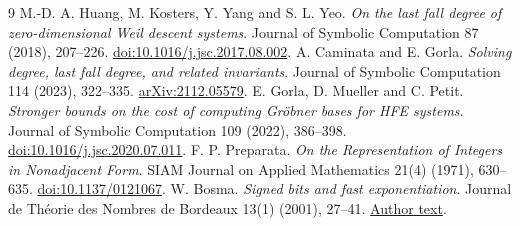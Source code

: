 \documentclass[11pt]{article}
\theoremstyle{remark}\newtheorem{remark}[theorem]{Remark}
\begin{document}
\begin{thebibliography}{9}
 M.-D. A. Huang, M. Kosters, Y. Yang and S. L. Yeo.
\emph{On the last fall degree of zero-dimensional Weil descent systems}.
Journal of Symbolic Computation 87 (2018), 207--226.
\href{https://doi.org/10.1016/j.jsc.2017.08.002}{doi:10.1016/j.jsc.2017.08.002}.
 A. Caminata and E. Gorla.
\emph{Solving degree, last fall degree, and related invariants}.
Journal of Symbolic Computation 114 (2023), 322--335.
\href{https://arxiv.org/abs/2112.05579}{arXiv:2112.05579}.
 E. Gorla, D. Mueller and C. Petit.
\emph{Stronger bounds on the cost of computing Gr\"obner bases for HFE systems}.
 Journal of Symbolic Computation 109 (2022), 386--398.
\href{https://doi.org/10.1016/j.jsc.2020.07.011}{doi:10.1016/j.jsc.2020.07.011}.
 F. P. Preparata.
\emph{On the Representation of Integers in Nonadjacent Form}.
SIAM Journal on Applied Mathematics 21(4) (1971), 630--635.
\href{https://doi.org/10.1137/0121067}{doi:10.1137/0121067}.
 W. Bosma.
\emph{Signed bits and fast exponentiation}.
Journal de Th\'eorie des Nombres de Bordeaux 13(1) (2001), 27--41.
\href{https://jtnb.centre-mersenne.org/article/JTNB_2001__13_1_27_0.pdf}{Author text}.
\end{thebibliography}
\end{document}
